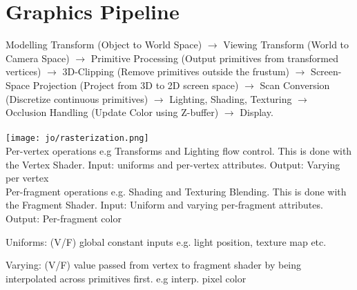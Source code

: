 \section{Graphics Pipeline}

Modelling Transform (Object to World Space) $ \rightarrow $ Viewing Transform (World to Camera Space) $ \rightarrow $ Primitive Processing (Output primitives from transformed vertices) $ \rightarrow $ 3D-Clipping (Remove primitives outside the frustum) $ \rightarrow $ Screen-Space Projection (Project from 3D to 2D screen space) $ \rightarrow $ Scan Conversion (Discretize continuous primitives) $ \rightarrow $ Lighting, Shading, Texturing $ \rightarrow $ Occlusion Handling (Update Color using Z-buffer) $ \rightarrow $ Display. \\
 \\
\texttt{[image: jo/rasterization.png]} \\
 Per-vertex operations e.g Transforms and Lighting flow control. This is done with the Vertex Shader.  Input: uniforms and per-vertex attributes. Output: Varying per vertex\\
 Per-fragment operations e.g. Shading and Texturing Blending. This is done with the Fragment Shader. Input: Uniform and varying per-fragment attributes. Output: Per-fragment color\\
\begin{compactitem}
    \item Uniforms: (V/F) global constant inputs e.g. light position, texture map etc.
    \item Varying: (V/F) value passed from vertex to fragment shader by being interpolated across primitives first. e.g interp. pixel color
\end{compactitem}


